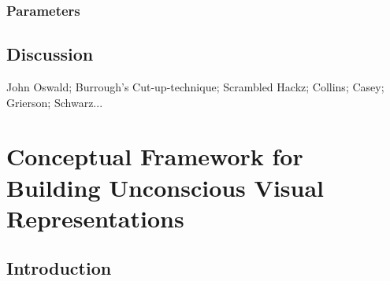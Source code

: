 \documentclass[a4paper,10pt,final]{ThesisStyle}
\begin{document}
\subsection{Parameters}
\label{subsec:parameters}

\section{Discussion}

John Oswald; Burrough's Cut-up-technique; Scrambled Hackz; Collins; Casey; Grierson; Schwarz...










\chapter{Conceptual Framework for Building Unconscious Visual Representations}
\label{ch:conceptual-visual}
\minitoc

\section{Introduction}
\end{document}
